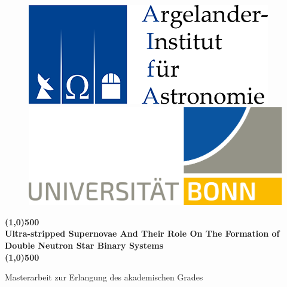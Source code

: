 \documentclass[a4paper, 11pt, twoside]{book}
\def\title{Ultra-stripped Supernovae And Their Role On The Formation of Double Neutron Star Binary Systems}
\begin{document}
    \frontmatter  %

    
    \begin{titlepage}
    	\begin{figure}[!t]
        
    		\begin{minipage}{.5\textwidth}    
            	\includegraphics[scale=1.6]{../figures/aifa_logo.png}
    		\end{minipage}%
    		\begin{minipage}{0.5\textwidth}
        		\hspace{2.5cm} \includegraphics[scale=0.17]{../figures/uni_logo.png}
		    \end{minipage}
	\end{figure}
 		  
       
        \begin{center} 

            \LARGE
            \textbf{\line(1,0){500}\\ \title \\ \line(1,0){500}}
            
            \vspace{1cm}
            \Large
            Masterarbeit zur Erlangung des akademischen Grades
            
            \vspace{0.3cm}
            

\end{center}
\end{titlepage}
\end{document}
